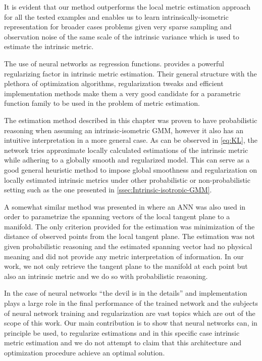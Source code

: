 	It is evident that our method outperforms the local metric estimation
	approach for all the tested examples and enables us to learn intrinsically-isometric
	representation for broader cases problems given very sparse sampling
	and observation noise of the same scale of the intrinsic variance
	which is used to estimate the intrinsic metric. 
	
	The use of neural networks as regression functions. provides a powerful
	regularizing factor in intrinsic metric estimation. Their general
	structure with the plethora of optimization algorithms, regularization
	tweaks and efficient implementation methods make them a very good
	candidate for a parametric function family to be used in the problem
	of metric estimation.
	
	The estimation method described in this chapter was proven to have
	probabilistic reasoning when assuming an intrinsic-isometric \ac{GMM},
	however it also has an intuitive interpretation in a more general
	case. As can be observed in \cref{eq:KL}, the network tries approximate
	locally calculated estimations of the intrinsic metric while adhering
	to a globally smooth and regularized model. This can serve as a good
	general heuristic method to impose global smoothness and regularization
	on locally estimated intrinsic metrics under other probabilistic or
	non-probabilistic setting such as the one presented in
	\cref{ssec:Intrinsic-isotropic-GMM}.
	
	A somewhat similar method was presented in \cite{bengio2004non} where
	an \ac{ANN} was also used in order to parametrize the spanning vectors
	of the local tangent plane to a manifold. The only criterion provided
	for the estimation was minimization of the distance of observed points
	from the local tangent plane. The estimation was not given probabilistic
	reasoning and the estimated spanning vector had no physical meaning
	and did not provide any metric interpretation of information. In our
	work, we not only retrieve the tangent plane to the manifold at each
	point but also an intrinsic metric and we do so with probabilistic
	reasoning.
	
	In the case of neural networks ``the devil is in the details'' and
	implementation plays a large role in the final performance of the
	trained network and the subjects of neural network training and regularization
	are vast topics which are out of the scope of this work. Our main
	contribution is to show that neural networks can, in principle be
	used, to regularize estimations and in this specific case intrinsic
	metric estimation and we do not attempt to claim that this architecture
	and optimization procedure achieve an optimal solution.
	
